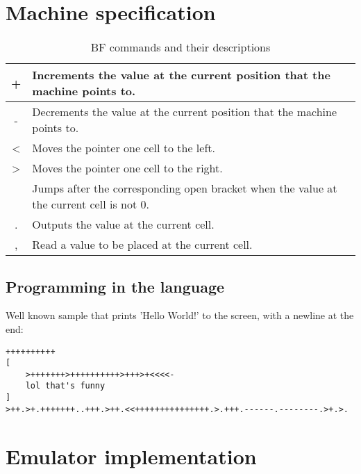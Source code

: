 \section{Machine specification}
\label{sec:ch2sec1}

\begin{table}[]
\centering
\begin{tabularx}{\textwidth}{| c | Y |}
\hline
+ & Increments the value at the current position that the machine points to. \\ \hline
- & Decrements the value at the current position that the machine points to. \\ \hline
\textless & Moves the pointer one cell to the left.                                  \\ \hline
\textgreater & Moves the pointer one cell to the right.                                 \\  & Jumps after the corresponding open bracket when the value at the current cell is not 0.   \\ \hline
. & Outputs the value at the current cell. \\ \hline
, & Read a value to be placed at the current cell. \\ \hline
\end{tabularx}
\caption{ BF commands and their descriptions }
\end{table}

\subsection{Programming in the language}
\label{sec:ch2sec1sub1}

\clearpage
\par Well known sample that prints 'Hello World!' to the screen, with a newline at the end:
\begin{verbatim}
++++++++++
[
	>+++++++>++++++++++>+++>+<<<<-
	lol that's funny
]
>++.>+.+++++++..+++.>++.<<+++++++++++++++.>.+++.------.--------.>+.>.
\end{verbatim}
\clearpage

\section{Emulator implementation}
\label{sec:ch2sec2}

